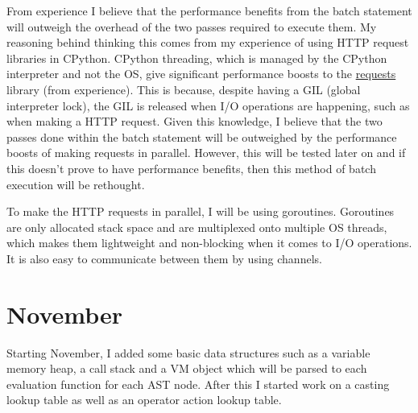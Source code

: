 \documentclass[]{interim}
\theoremstyle{definition}
\begin{document}
From experience I believe that the performance benefits from the batch statement will outweigh the overhead of the two passes required to execute them. My reasoning behind thinking this comes from my experience of using HTTP request libraries in CPython. CPython threading, which is managed by the CPython interpreter and not the OS, give significant performance boosts to the \href{https://docs.python-requests.org/en/latest/}{requests} library (from experience). This is because, despite having a GIL (global interpreter lock), the GIL is released when I/O operations are happening, such as when making a HTTP request. Given this knowledge, I believe that the two passes done within the batch statement will be outweighed by the performance boosts of making requests in parallel. However, this will be tested later on and if this doesn't prove to have performance benefits, then this method of batch execution will be rethought.

To make the HTTP requests in parallel, I will be using goroutines. Goroutines are only allocated stack space and are multiplexed onto multiple OS threads, which makes them lightweight and non-blocking when it comes to I/O operations\textsuperscript{\cite{effective-go}}. It is also easy to communicate between them by using channels.

\section{November}

Starting November, I added some basic data structures such as a variable memory heap, a call stack and a VM object which will be parsed to each evaluation function for each AST node. After this I started work on a casting lookup table as well as an operator action lookup table.

\newpage
\label{endpage}
\printbibliography
\end{document}
